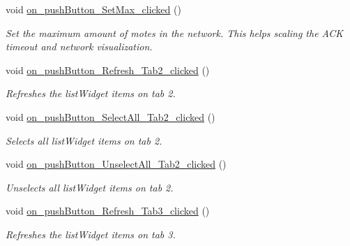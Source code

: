 \begin{DoxyCompactItemize}
\mbox{\label{classMainWindow_ab391669c647ea75c64e2e1258323d286}} 
void \hyperlink{classMainWindow_ab391669c647ea75c64e2e1258323d286}{on\+\_\+push\+Button\+\_\+\+Set\+Max\+\_\+clicked} ()
\begin{DoxyCompactList}\small\item\em Set the maximum amount of motes in the network. This helps scaling the A\+CK timeout and network visualization. \end{DoxyCompactList}\item 
\mbox{\label{classMainWindow_a362f1eff4b76dfa1761db912e99e7083}} 
void \hyperlink{classMainWindow_a362f1eff4b76dfa1761db912e99e7083}{on\+\_\+push\+Button\+\_\+\+Refresh\+\_\+\+Tab2\+\_\+clicked} ()
\begin{DoxyCompactList}\small\item\em Refreshes the list\+Widget items on tab 2. \end{DoxyCompactList}\item 
\mbox{\label{classMainWindow_aa391a38cfddba913c5a3a3a96e7dc00f}} 
void \hyperlink{classMainWindow_aa391a38cfddba913c5a3a3a96e7dc00f}{on\+\_\+push\+Button\+\_\+\+Select\+All\+\_\+\+Tab2\+\_\+clicked} ()
\begin{DoxyCompactList}\small\item\em Selects all list\+Widget items on tab 2. \end{DoxyCompactList}\item 
\mbox{\label{classMainWindow_a96ce66930f135a8788b1b77d22e404e6}} 
void \hyperlink{classMainWindow_a96ce66930f135a8788b1b77d22e404e6}{on\+\_\+push\+Button\+\_\+\+Unselect\+All\+\_\+\+Tab2\+\_\+clicked} ()
\begin{DoxyCompactList}\small\item\em Unselects all list\+Widget items on tab 2. \end{DoxyCompactList}\item 
\mbox{\label{classMainWindow_a886cb1ed2510a7fc3de35874eab50a19}} 
void \hyperlink{classMainWindow_a886cb1ed2510a7fc3de35874eab50a19}{on\+\_\+push\+Button\+\_\+\+Refresh\+\_\+\+Tab3\+\_\+clicked} ()
\begin{DoxyCompactList}\small\item\em Refreshes the list\+Widget items on tab 3. \end{DoxyCompactList}\item 

\end{DoxyCompactItemize}
